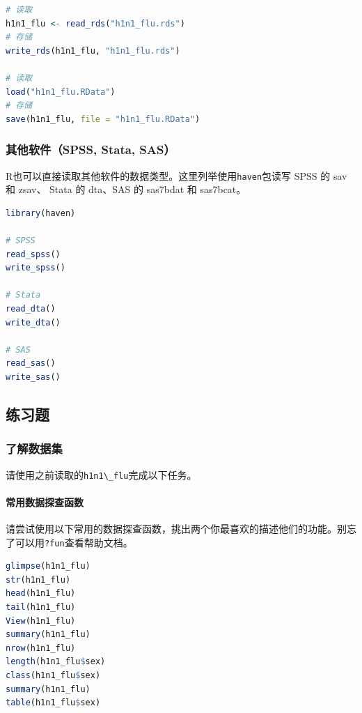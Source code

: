 \documentclass[]{ctexbook}
\let\oldparagraph\paragraph
\renewcommand{\paragraph}[1]{\oldparagraph{#1}\mbox{}}
\newcommand{\passthrough}[1]{#1}
\begin{document}
\begin{lstlisting}[language=R]
# 读取
h1n1_flu <- read_rds("h1n1_flu.rds")
# 存储
write_rds(h1n1_flu, "h1n1_flu.rds")

# 读取
load("h1n1_flu.RData")
# 存储
save(h1n1_flu, file = "h1n1_flu.RData")
\end{lstlisting}

\hypertarget{ux5176ux4ed6ux8f6fux4ef6spss-stata-sas}{%
\subsubsection{其他软件（SPSS, Stata, SAS）}\label{ux5176ux4ed6ux8f6fux4ef6spss-stata-sas}}

R也可以直接读取其他软件的数据类型。这里列举使用\passthrough{\lstinline!haven!}包读写 SPSS 的 sav 和 zsav、 Stata 的 dta、SAS 的 sas7bdat 和 sas7bcat。

\begin{lstlisting}[language=R]
library(haven)

# SPSS
read_spss()
write_spss()

# Stata
read_dta() 
write_dta() 

# SAS
read_sas()
write_sas()
\end{lstlisting}

\hypertarget{ux7ec3ux4e60ux9898}{%
\subsection{练习题}\label{ux7ec3ux4e60ux9898}}

\hypertarget{ux4e86ux89e3ux6570ux636eux96c6}{%
\subsubsection{了解数据集}\label{ux4e86ux89e3ux6570ux636eux96c6}}

请使用之前读取的\passthrough{\lstinline!h1n1\_flu!}完成以下任务。

\hypertarget{ux5e38ux7528ux6570ux636eux63a2ux67e5ux51fdux6570}{%
\paragraph{常用数据探查函数}\label{ux5e38ux7528ux6570ux636eux63a2ux67e5ux51fdux6570}}

请尝试使用以下常用的数据探查函数，挑出两个你最喜欢的描述他们的功能。别忘了可以用\passthrough{\lstinline!?fun!}查看帮助文档。

\begin{lstlisting}[language=R]
glimpse(h1n1_flu)
str(h1n1_flu)
head(h1n1_flu)
tail(h1n1_flu)
View(h1n1_flu)
summary(h1n1_flu)
nrow(h1n1_flu)
length(h1n1_flu$sex)
class(h1n1_flu$sex)
summary(h1n1_flu)
table(h1n1_flu$sex)
\end{lstlisting}
\end{document}
